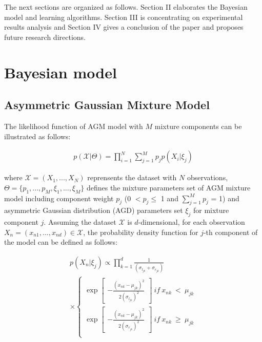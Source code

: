 \documentclass[conference]{IEEEtran}
\begin{document}
The next sections are organized as follows. Section II elaborates the Bayesian model and learning algorithms. Section III is concentrating on experimental results analysis and Section IV gives a conclusion of the paper and proposes future research directions.


\section{Bayesian model}
\subsection{Asymmetric Gaussian Mixture Model}
The likelihood function of AGM model\cite{Elguebaly2014} with $M$ mixture components can be illustrated as follows:

\begin{align}
p(\mathcal{X}|\Theta) = \prod_{i=1}^N \sum_{j=1}^Mp_jp(X_i|\xi_j)
\label{eq:likelihood}
\end{align}

where $\mathcal{X} = (X_1,...,X_N)$ reprensents the dataset with $N$ observations, $\Theta = \{p_1,...,p_M, \xi_1,...,\xi_M\}$ defines the mixture parameters set of AGM mixture model including component weight $p_j$ (0 $< p_j \leq$ 1 and $\sum_{j=1}^Mp_j$ = 1) and asymmetric Gaussian distribution (AGD) parameters set $\xi_j$ for mixture component $j$. Assuming the dataset $\mathcal{X}$ is $d$-dimensional, for each observation $X_n = (x_{n1},...,x_{nd})\in\mathcal{X}$, the probability density function\cite{Elguebaly2014} for $j$-th component of the model can be defined as follows:

\begin{multline}
p(X_n|\xi_j) \propto \prod_{k=1}^{d} \frac{1}{(\sigma_{l_{jk}}+\sigma_{r_{jk}})} \\
\times \left\{\begin{matrix}
\exp \begin{bmatrix}
-\frac{(x_{nk}-\mu_{jk})^2}{2(\sigma_{l_{jk}})^2}
\end{bmatrix}\ if\ x_{nk}\ <\ \mu_{jk} \\ 
\exp \begin{bmatrix}
-\frac{(x_{nk}-\mu_{jk})^2}{2(\sigma_{r_{jk}})^2}
\end{bmatrix}\ if\ x_{nk}\ \geqslant\ \mu_{jk} \\ 
\end{matrix}\right.
\label{eq:pdf}
\end{multline}
\end{document}
